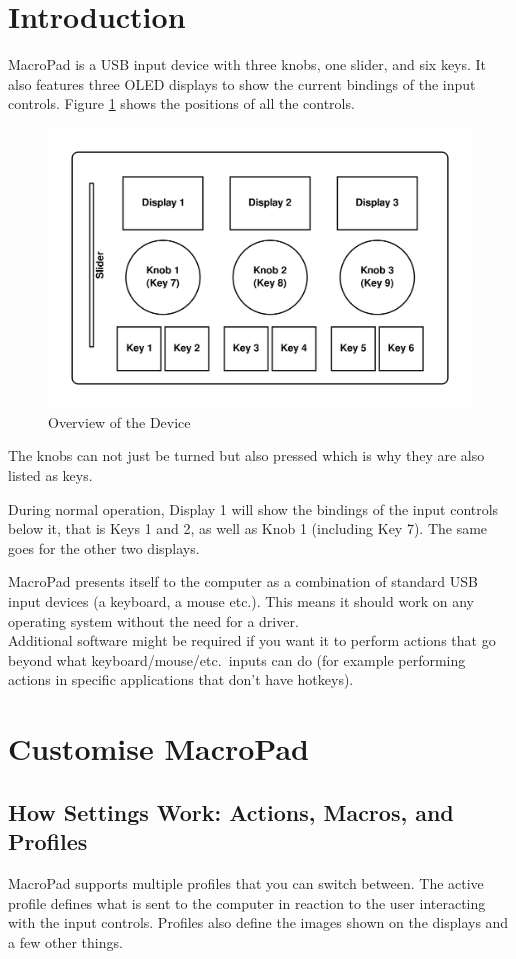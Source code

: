 \documentclass{article}
\begin{document}
\section{Introduction}
MacroPad is a USB input device with three knobs, one slider, and six keys. It also features three OLED displays to show the current bindings of the input controls. Figure \ref{fig:overview} shows the positions of all the controls.
\begin{figure}[htb]
\centering
\includegraphics[width=\textwidth]{Images/Overview.png}
\caption{Overview of the Device}
\label{fig:overview}
\end{figure}

The knobs can not just be turned but also pressed which is why they are also listed as keys.

During normal operation, Display 1 will show the bindings of the input controls below it, that is Keys 1 and 2, as well as Knob 1 (including Key 7). The same goes for the other two displays.

MacroPad presents itself to the computer as a combination of standard USB input devices (a keyboard, a mouse etc.). This means it should work on any operating system without the need for a driver.\\
Additional software might be required if you want it to perform actions that go beyond what keyboard/mouse/etc.\ inputs can do (for example performing actions in specific applications that don't have hotkeys).

\section{Customise MacroPad}\label{sec:customise}
\subsection{How Settings Work: Actions, Macros, and Profiles}\label{sec:settings}
MacroPad supports multiple profiles that you can switch between. The active profile defines what is sent to the computer in reaction to the user interacting with the input controls. Profiles also define the images shown on the displays and a few other things.
\end{document}
